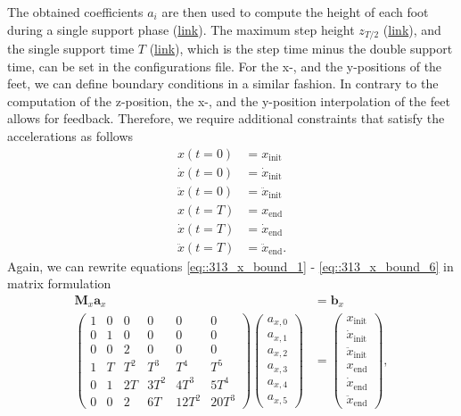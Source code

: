 The obtained coefficients $a_i$ are then used to compute the height of each foot during a single support phase (\href{https://github.com/mhubii/nmpc_pattern_generator/blob/c82c64a28da7527e75442764f585bd50a8f61ee9/libs/pattern_generator/src/interpolation.cpp#L779}{link}). The maximum step height $z_{T/2}$ (\href{https://github.com/mhubii/nmpc_pattern_generator/blob/c82c64a28da7527e75442764f585bd50a8f61ee9/libs/pattern_generator/configs.yaml#L22}{link}), and the single support time $T$ (\href{https://github.com/mhubii/nmpc_pattern_generator/blob/c82c64a28da7527e75442764f585bd50a8f61ee9/libs/pattern_generator/configs.yaml#L21}{link}), which is the step time minus the double support time, can be set in the configurations file. For the x-, and the y-positions of the feet, we can define boundary conditions in a similar fashion. In contrary to the computation of the z-position, the x-, and the y-position interpolation of the feet allows for feedback. Therefore, we require additional constraints that satisfy the accelerations as follows
\begin{align}
	x(t = 0) &= x_\text{init} 
	\label{eq::313_x_bound_1}\\
	\dot{x}(t=0) &= \dot{x}_\text{init} \\
	\ddot{x}(t=0) &= \ddot{x}_\text{init} \\
	x(t=T) &= x_\text{end}\\
	\dot{x}(t=T) &= \dot{x}_\text{end} \\
	\ddot{x}(t=T) &= \ddot{x}_\text{end}.
	\label{eq::313_x_bound_6}
\end{align}
Again, we can rewrite equations \ref{eq::313_x_bound_1} - \ref{eq::313_x_bound_6} in matrix formulation
\begin{align}
	\bm{M}_x\bm{a}_x &= \bm{b}_x \\
	\begin{pmatrix}
		1 & 0 & 0 & 0 & 0 & 0 \\
		0 & 1 & 0 & 0 & 0 & 0 \\
		0 & 0 & 2 & 0 & 0 & 0 \\
		1 & T & T^2 & T^3 & T^4 & T^5 \\
		0 & 1 & 2 T & 3 T^2 & 4 T^3 & 5 T^4 \\
		0 & 0 & 2 & 6 T & 12 T^2 & 20 T^3
	\end{pmatrix}
	\begin{pmatrix}
		a_{x,0} \\
		a_{x,1} \\
		a_{x,2} \\
		a_{x,3} \\
		a_{x,4} \\
		a_{x,5}
	\end{pmatrix} &=
	\begin{pmatrix}
		x_\text{init} \\
		\dot{x}_\text{init} \\
		\ddot{x}_\text{init} \\
		x_\text{end} \\
		\dot{x}_\text{end} \\
		\ddot{x}_\text{end} 
	\end{pmatrix},
\end{align}
